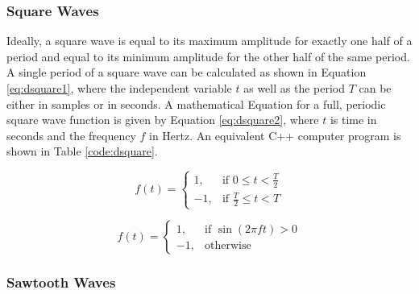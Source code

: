 \documentclass[12pt,twoside]{report}
\begin{document}
\subsubsection{Square Waves}

Ideally, a square wave is equal to its maximum amplitude for exactly one half of a period and equal to its minimum amplitude for the other half of the same period. A single period of a square wave can be calculated as shown in Equation \ref{eq:dsquare1}, where the independent variable $t$ as well as the period $T$ can be either in samples or in seconds. A mathematical Equation for a full, periodic square wave function is given by Equation \ref{eq:dsquare2}, where $t$ is time in seconds and the frequency $f$ in Hertz. An equivalent C++ computer program is shown in Table \ref{code:dsquare}.

\begin{multicols}{2}

  \begin{equation}
    f(t) =
    \begin{cases}
      1,& \text{if } 0 \leq t < \frac{T}{2}\\
      -1,& \text{if } \frac{T}{2} \leq t < T
    \end{cases}
    \label{eq:dsquare1}
  \end{equation}

  \begin{equation}
    f(t) =
    \begin{cases}
      1,& \text{if } \sin(2 \pi f t) > 0\\
      -1,& \text{otherwise}
    \end{cases}
    \label{eq:dsquare2}
  \end{equation}

\end{multicols}

\begin{table}
\end{table}

\subsubsection{Sawtooth Waves}
\end{document}
